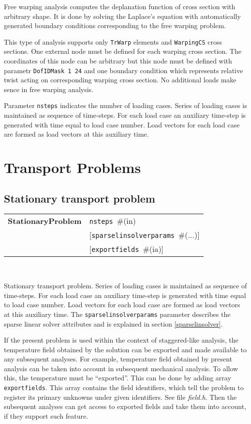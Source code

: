 \documentclass[a4paper]{report}
\newcommand{\param}[1]{\texttt{#1}} %
\newcommand{\optional}[1]{[#1]} %
\newcommand{\field}[2]{\param{#1}~\#{\tiny(#2)}} %
\newcommand{\optField}[2]{\optional{\field{#1}{#2}}}
\newcommand{\entKeywordInst}[1]{\textbf{#1}} %
\newcommand{\missing}[1]{}
\newenvironment{record}[1][]{\begin{tabular}{|ll}}{\end{tabular}\\}
\newcommand{\recentry}[2]{{#1}&{#2}\\}
\newcounter{rcc}
\newenvironment{record}[1][\textwidth]{\setcounter{rcc}{0}\rowcolors{1}{lightgray}{lightgray}\tabularx{#1}{llR} \hline}
               {\endtabularx}
\newcommand{\recentry}[2]{\ifthenelse{\value{rcc}>0}{$\backslash$ \\}{\setcounter{rcc}{1}}{#1}&{#2}&}
\begin{document}
Free warping analysis computes the deplanation function of cross section with arbitrary shape. It is done by solving the Laplace's equation with automatically generated boundary conditions corresponding to the free warping problem.

This type of analysis supports only \param{TrWarp} elements and \param{WarpingCS} cross sections. One external node must be defined for each warping cross section. The coordinates of this node can be arbitrary but this node must be defined with parametr  \param{DofIDMask 1 24} and one boundary condition which represents relative twist acting on corresponding warping cross section. No additional loads make sence in free warping analysis.

Parameter \param{nsteps} indicates the number of loading cases.
Series of loading cases is maintained as sequence of time-steps.
For each load case an auxiliary time-step is generated with time
equal to load case number.
Load vectors for each load case are formed as load vectors at
this auxiliary time.

\missing{QClinearStatic}


\section{Transport Problems}
\subsection{Stationary transport problem}
\label{StationaryTransport}

\begin{record}
  \recentry{\entKeywordInst{StationaryProblem}}{\field{nsteps}{in}}
  \recentry{}{\optField{sparselinsolverparams}{...}}
  \recentry{}{\optField{exportfields}{ia}}
\end{record}

Stationary transport problem.
Series of loading cases is maintained as sequence of time-steps.
For each load case an auxiliary time-step is generated with time
equal to load case number.
Load vectors for each load case are formed as load vectors at
this auxiliary time.
The  \param{sparselinsolverparams} parameter describes the sparse
linear solver attributes and is explained in section \ref{sparselinsolver}.

If the present problem is used within the context
of staggered-like analysis, the temperature field obtained by the
solution can be exported and made available to any subsequent
analyses. For example, temperature field obtained by present analysis
can be taken into account in subsequent mechanical analysis.
To allow this, the temperature must be ``exported''. This can be done
by adding array \param{exportfields}. This array contains the field
identifiers, which tell the problem to register its primary unknowns
under given identifiers. See file {\it field.h}.
Then the subsequent analyses can get access to exported fields 
and take them into account, if they support such feature.
\end{document}
